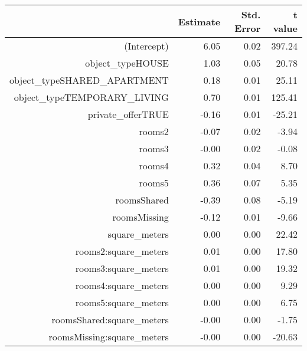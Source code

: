 \begin{table}[ht]
\centering
\begin{tabular}{rrrr}
  \hline
 & Estimate & Std. Error & t value \\ 
  \hline
(Intercept) & 6.05 & 0.02 & 397.24 \\ 
  object\_typeHOUSE & 1.03 & 0.05 & 20.78 \\ 
  object\_typeSHARED\_APARTMENT & 0.18 & 0.01 & 25.11 \\ 
  object\_typeTEMPORARY\_LIVING & 0.70 & 0.01 & 125.41 \\ 
  private\_offerTRUE & -0.16 & 0.01 & -25.21 \\ 
  rooms2 & -0.07 & 0.02 & -3.94 \\ 
  rooms3 & -0.00 & 0.02 & -0.08 \\ 
  rooms4 & 0.32 & 0.04 & 8.70 \\ 
  rooms5 & 0.36 & 0.07 & 5.35 \\ 
  roomsShared & -0.39 & 0.08 & -5.19 \\ 
  roomsMissing & -0.12 & 0.01 & -9.66 \\ 
  square\_meters & 0.00 & 0.00 & 22.42 \\ 
  rooms2:square\_meters & 0.01 & 0.00 & 17.80 \\ 
  rooms3:square\_meters & 0.01 & 0.00 & 19.32 \\ 
  rooms4:square\_meters & 0.00 & 0.00 & 9.29 \\ 
  rooms5:square\_meters & 0.00 & 0.00 & 6.75 \\ 
  roomsShared:square\_meters & -0.00 & 0.00 & -1.75 \\ 
  roomsMissing:square\_meters & -0.00 & 0.00 & -20.63 \\ 
   \hline
\end{tabular}
\end{table}
